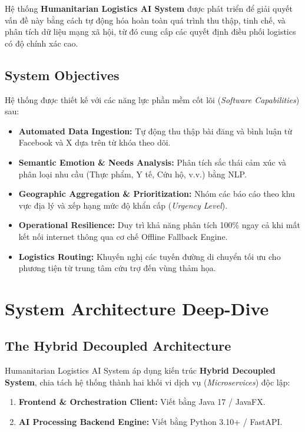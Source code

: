 \documentclass[12pt,a4paper]{article}
\begin{document}
Hệ thống \textbf{Humanitarian Logistics AI System} được phát triển để giải quyết vấn đề này bằng cách tự động hóa hoàn toàn quá trình thu thập, tinh chế, và phân tích dữ liệu mạng xã hội, từ đó cung cấp các quyết định điều phối logistics có độ chính xác cao.

\subsection{System Objectives}
Hệ thống được thiết kế với các năng lực phần mềm cốt lõi (\textit{Software Capabilities}) sau:
\begin{itemize}
    \item \textbf{Automated Data Ingestion:} Tự động thu thập bài đăng và bình luận từ Facebook và X dựa trên từ khóa theo dõi.
    \item \textbf{Semantic Emotion \& Needs Analysis:} Phân tích sắc thái cảm xúc và phân loại nhu cầu (Thực phẩm, Y tế, Cứu hộ, v.v.) bằng NLP.
    \item \textbf{Geographic Aggregation \& Prioritization:} Nhóm các báo cáo theo khu vực địa lý và xếp hạng mức độ khẩn cấp (\textit{Urgency Level}).
    \item \textbf{Operational Resilience:} Duy trì khả năng phân tích 100\% ngay cả khi mất kết nối internet thông qua cơ chế Offline Fallback Engine.
    \item \textbf{Logistics Routing:} Khuyến nghị các tuyến đường di chuyển tối ưu cho phương tiện từ trung tâm cứu trợ đến vùng thảm họa.
\end{itemize}

\newpage

\section{System Architecture Deep-Dive}

\subsection{The Hybrid Decoupled Architecture}
Humanitarian Logistics AI System áp dụng kiến trúc \textbf{Hybrid Decoupled System}, chia tách hệ thống thành hai khối vi dịch vụ (\textit{Microservices}) độc lập:
\begin{enumerate}
    \item \textbf{Frontend \& Orchestration Client:} Viết bằng Java 17 / JavaFX.
    \item \textbf{AI Processing Backend Engine:} Viết bằng Python 3.10+ / FastAPI.
\end{enumerate}
\end{document}
